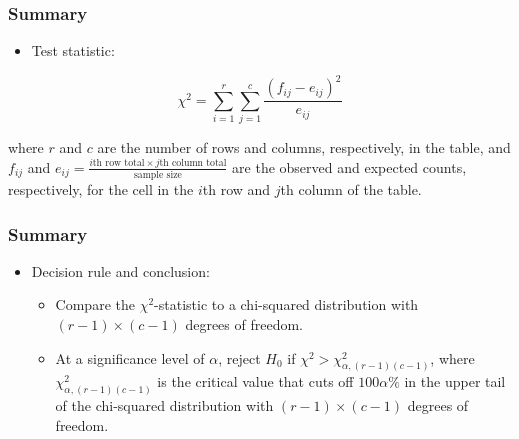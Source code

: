 \documentclass[12pt]{beamer}
\begin{document}
\begin{frame}
	\frametitle{Summary}
	
	\begin{itemize}[label={\color{blue}$\blacktriangleright$}]
		\item Test statistic:
	\end{itemize}
	
	\[
	\chi^2 = \sum_{i=1}^r \sum_{j=1}^c \frac{(f_{ij} - e_{ij})^2}{e_{ij}}
	\]
	
	\medskip
	
	where $r$ and $c$ are the number of rows and columns, respectively, in the table, and $f_{ij}$ and
	$e_{ij} = \frac{\text{$i$th row total} \times \text{$j$th column total}}{\text{sample size}}$ are the observed and expected counts, respectively, for the cell in the $i$th row and $j$th column of the table.
	
\end{frame}
\begin{frame}
	\frametitle{Summary}
	
	\begin{itemize}[label={\color{blue}$\blacktriangleright$}]
		\item Decision rule and conclusion:
		\begin{itemize}[label={\color{blue}$\blacktriangleright$}]
			\item Compare the $\chi^2$-statistic to a chi-squared distribution with $(r-1) \times (c-1)$ degrees of freedom.
			\item At a significance level of $\alpha$, reject $H_0$ if $\chi^2 > \chi^2_{\alpha,(r-1)(c-1)}$, where $\chi^2_{\alpha,(r-1)(c-1)}$ is the critical value that cuts off $100\alpha\%$ in the upper tail of the chi-squared distribution with $(r-1) \times (c-1)$ degrees of freedom.
		\end{itemize}
	\end{itemize}
	
\end{frame}
\end{document}
